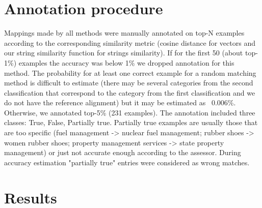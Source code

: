 \documentclass[11pt,a4paper]{article}
\begin{document}
\section{Annotation procedure}

Mappings made by all methods were manually annotated on top-N examples according to the corresponding similarity metric (cosine distance for vectors and our string similarity function for strings similarity). If for the first 50 (about top-1\%) examples the accuracy was below 1\% we dropped annotation for this method. The probability for at least one correct example for a random matching method is difficult to estimate (there may be several categories from the second classification that correspond  to the category from the first classification and we do not have the reference alignment) but it may be estimated as ~0.006\%. Otherwise, we annotated top-5\% (231 examples). The annotation included three classes: True, False, Partially true. Partially true examples are usually those that are too specific (fuel management -> nuclear fuel management; rubber shoes -> women rubber shoes; property management services -> state property management) or just not accurate enough according to the assessor. During accuracy estimation "partially true" entries were considered as wrong matches.
\section{Results}
\end{document}
